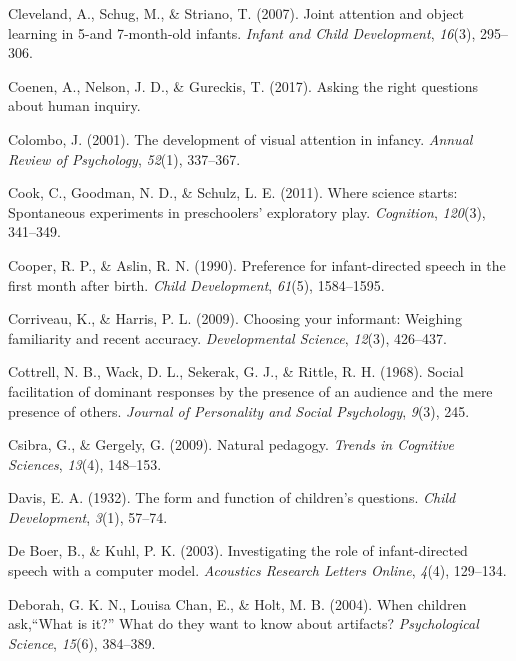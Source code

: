 \documentclass[oneside]{report}
\begin{document}
\leavevmode\hypertarget{ref-cleveland2007joint}{}%
Cleveland, A., Schug, M., \& Striano, T. (2007). Joint attention and
object learning in 5-and 7-month-old infants. \emph{Infant and Child
Development}, \emph{16}(3), 295--306.

\leavevmode\hypertarget{ref-coenen2017asking}{}%
Coenen, A., Nelson, J. D., \& Gureckis, T. (2017). Asking the right
questions about human inquiry.

\leavevmode\hypertarget{ref-colombo2001development}{}%
Colombo, J. (2001). The development of visual attention in infancy.
\emph{Annual Review of Psychology}, \emph{52}(1), 337--367.

\leavevmode\hypertarget{ref-cook2011science}{}%
Cook, C., Goodman, N. D., \& Schulz, L. E. (2011). Where science starts:
Spontaneous experiments in preschoolers' exploratory play.
\emph{Cognition}, \emph{120}(3), 341--349.

\leavevmode\hypertarget{ref-cooper1990preference}{}%
Cooper, R. P., \& Aslin, R. N. (1990). Preference for infant-directed
speech in the first month after birth. \emph{Child Development},
\emph{61}(5), 1584--1595.

\leavevmode\hypertarget{ref-corriveau2009choosing}{}%
Corriveau, K., \& Harris, P. L. (2009). Choosing your informant:
Weighing familiarity and recent accuracy. \emph{Developmental Science},
\emph{12}(3), 426--437.

\leavevmode\hypertarget{ref-cottrell1968social}{}%
Cottrell, N. B., Wack, D. L., Sekerak, G. J., \& Rittle, R. H. (1968).
Social facilitation of dominant responses by the presence of an audience
and the mere presence of others. \emph{Journal of Personality and Social
Psychology}, \emph{9}(3), 245.

\leavevmode\hypertarget{ref-csibra2009natural}{}%
Csibra, G., \& Gergely, G. (2009). Natural pedagogy. \emph{Trends in
Cognitive Sciences}, \emph{13}(4), 148--153.

\leavevmode\hypertarget{ref-davis1932form}{}%
Davis, E. A. (1932). The form and function of children's questions.
\emph{Child Development}, \emph{3}(1), 57--74.

\leavevmode\hypertarget{ref-de2003investigating}{}%
De Boer, B., \& Kuhl, P. K. (2003). Investigating the role of
infant-directed speech with a computer model. \emph{Acoustics Research
Letters Online}, \emph{4}(4), 129--134.

\leavevmode\hypertarget{ref-deborah2004children}{}%
Deborah, G. K. N., Louisa Chan, E., \& Holt, M. B. (2004). When children
ask,``What is it?'' What do they want to know about artifacts?
\emph{Psychological Science}, \emph{15}(6), 384--389.
\end{document}
